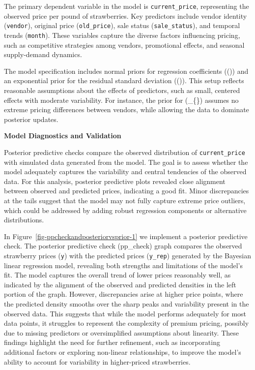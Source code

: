 \documentclass[
  letterpaper,
  DIV=11,
  numbers=noendperiod]{scrartcl}
\begin{document}
The primary dependent variable in the model is \texttt{current\_price},
representing the observed price per pound of strawberries. Key
predictors include vendor identity (\texttt{vendor}), original price
(\texttt{old\_price}), sale status (\texttt{sale\_status}), and temporal
trends (\texttt{month}). These variables capture the diverse factors
influencing pricing, such as competitive strategies among vendors,
promotional effects, and seasonal supply-demand dynamics.

The model specification includes normal priors for regression
coefficients ((\beta)) and an exponential prior for the residual
standard deviation ((\sigma)). This setup reflects reasonable
assumptions about the effects of predictors, such as small, centered
effects with moderate variability. For instance, the prior for
(\beta\_\{\}) assumes no extreme pricing differences
between vendors, while allowing the data to dominate posterior updates.

\textbf{Model Diagnostics and Validation}

Posterior predictive checks compare the observed distribution of
\texttt{current\_price} with simulated data generated from the model.
The goal is to assess whether the model adequately captures the
variability and central tendencies of the observed data. For this
analysis, posterior predictive plots revealed close alignment between
observed and predicted prices, indicating a good fit. Minor
discrepancies at the tails suggest that the model may not fully capture
extreme price outliers, which could be addressed by adding robust
regression components or alternative distributions.

In Figure~\ref{fig-ppcheckandposteriorvsprior-1} we implement a
posterior predictive check. The posterior predictive check (pp\_check)
graph compares the observed strawberry prices (\texttt{y}) with the
predicted prices (\texttt{y\_rep}) generated by the Bayesian linear
regression model, revealing both strengths and limitations of the
model's fit. The model captures the overall trend of lower prices
reasonably well, as indicated by the alignment of the observed and
predicted densities in the left portion of the graph. However,
discrepancies arise at higher price points, where the predicted density
smooths over the sharp peaks and variability present in the observed
data. This suggests that while the model performs adequately for most
data points, it struggles to represent the complexity of premium
pricing, possibly due to missing predictors or oversimplified
assumptions about linearity. These findings highlight the need for
further refinement, such as incorporating additional factors or
exploring non-linear relationships, to improve the model's ability to
account for variability in higher-priced strawberries.
\end{document}
